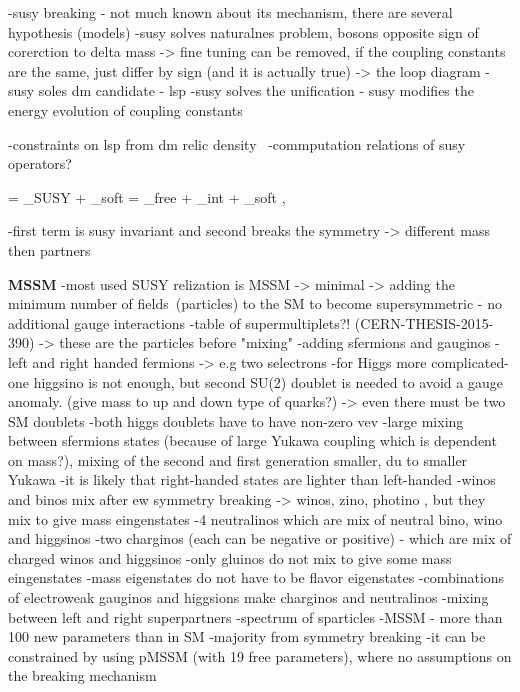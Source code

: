 -susy breaking - not much known about its mechanism, there are several hypothesis (models)
-susy solves naturalnes problem, bosons opposite sign of corerction to delta mass -> fine tuning can be removed, if the coupling constants are the same, just differ by sign (and it is actually true)
	-> the loop diagram
-susy soles dm candidate - lsp
-susy solves the unification - susy modifies the energy evolution of coupling constants 

-constraints on lsp from dm relic density~\cite{Ade:2015xua}
-commputation relations of susy operators?

{
     =  _{SUSY} +  _{soft} = _{free} + _{int} + _{soft}    ,
}

-first term is susy invariant and second breaks the symmetry -> different mass then partners

\textbf{MSSM}
-most used SUSY relization is MSSM -> minimal -> adding the minimum number of fields~(particles) to the SM to become supersymmetric
- no additional gauge interactions
-table of supermultiplets?! (CERN-THESIS-2015-390) -> these are the particles before "mixing"
-adding sfermions and gauginos - left and right handed fermions -> e.g two selectrons
-for Higgs more complicated- one higgsino is not enough, but second SU(2) doublet is needed to avoid a gauge anomaly. (give mass to up and down type of quarks?) -> even there must be two SM doublets
-both higgs doublets have to have non-zero vev
-large mixing between sfermions states (because of large Yukawa coupling which is dependent on mass?), mixing of the second and first generation smaller, du to smaller Yukawa
-it is likely that right-handed states are lighter than left-handed
-winos and binos mix after ew symmetry breaking -> winos, zino, photino , but they mix to give mass eingenstates
	-4 neutralinos which are mix of neutral bino, wino and higgsinos
	-two charginos (each can be negative or positive) - which are mix of charged winos and higgsinos
-only gluinos do not mix to give some mass eingenstates
-mass eigenstates do not have to be flavor eigenstates
-combinations of electroweak gauginos and higgsions make charginos and neutralinos
-mixing between left and right superpartners 
-spectrum of sparticles
-MSSM - more than 100 new parameters than in SM
	-majority from symmetry breaking
	-it can be constrained by using pMSSM (with 19 free parameters), where no assumptions on the breaking mechanism 

